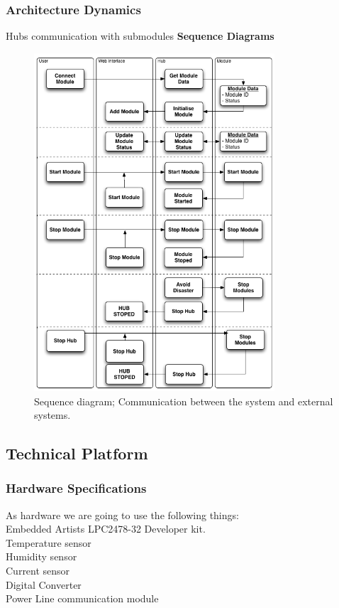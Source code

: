 	\subsubsection{Architecture Dynamics}
		Hubs communication with submodules
		\textbf{Sequence Diagrams}
		\begin{figure}[H]		%
			\begin{centering}
				 \includegraphics[width=0.8\textwidth]{images/SequenceDiagram.png}
				\caption{Sequence diagram; Communication between the system and external systems.}
		 	\end{centering}
		\end{figure}	
\subsection{Technical Platform}

	\subsubsection{Hardware Specifications}
	As hardware we are going to use the following things: 
	\\Embedded Artists LPC2478-32 Developer kit.
	\\Temperature sensor
	\\Humidity sensor
	\\Current sensor
	\\Digital Converter
	\\Power Line communication module
